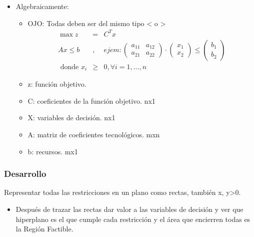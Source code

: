 \documentclass[12pt, twoside, openright]{report} %
\begin{document}
    \begin{itemize}
  
    \item
      Algebraicamente:

      \begin{itemize}
      \item
        OJO: Todas deben ser del mismo tipo \textless{} o \textgreater{}
		\begin{eqnarray*} 
			\max z &=& C^{T}x \\  
			Ax\leq b&,& ejem: \begin{pmatrix}  a_{11} & a_{12} \\  
			a_{21} & a_{22}  \end{pmatrix} \cdot \begin{pmatrix}  x_1\\  
			x_2  \end{pmatrix} \leq \begin{pmatrix}  b_1\\  
			b_2  \end{pmatrix}\\  
			\text { donde } x_{i} &\geq& 0, \forall i=1, \ldots, n
		\end{eqnarray*}
      \item
        z: función objetivo.
      \item
        C: coeficientes de la función objetivo. nx1
      \item
        X: variables de decisión. nx1
      \item
        A: matriz de coeficientes tecnológicos. mxn
	  \item b: recursos. mx1
      \end{itemize}
    \end{itemize}

	\subsubsection{Desarrollo}

	
      Representar todas las restricciones en un plano como rectas,
      también x, y\textgreater0.

      \begin{itemize}
    
      \item
        Después de trazar las rectas dar valor a las variables de
        decisión y ver que hiperplano es el que cumple cada restricción
        y el área que encierren todas es la Región Factible.
      \end{itemize}
\end{document}
